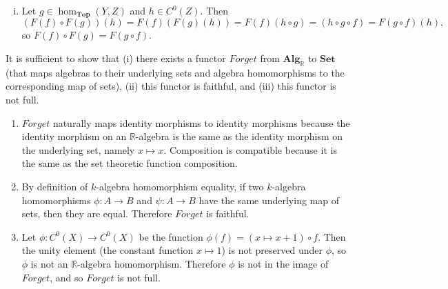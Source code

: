 \documentclass{article}
\newenvironment{problem}[2][Problem]{\begin{trivlist}
\item[\hskip \labelsep {\bfseries #1}\hskip \labelsep {\bfseries #2.}]}{\end{trivlist}}
\newenvironment{problempart}[1]{\begin{trivlist}\item[\textbf{Part #1.}]}{\end{trivlist}}
\begin{document}
\begin{problem}{7}
\begin{problempart}{(c)}
\begin{enumerate}[(i)]
{      }
      \item{
        Let $g \in \operatorname{hom}_{\textbf{Top}}(Y, Z)$ and $h \in C^0(Z)$.
        Then \[
          (F(f) \circ F(g))(h) = F(f)(F(g)(h))
          = F(f)(h\circ g)
          = (h\circ g\circ f)
          = F(g\circ f)(h),
        \] so $F(f) \circ F(g) = F(g\circ f)$.
        }
    \end{enumerate}
  \end{problempart}
  \begin{problempart}{(d)}
    It is sufficient to show that (i) there exists a functor $\textit{Forget}$ from
    $\textbf{Alg}_\mathbb{R}$ to $\textbf{Set}$ (that maps algebras to their
    underlying sets and algebra homomorphisms to the corresponding map of sets),
    (ii) this functor is faithful, and (iii) this functor is not full.
    \begin{enumerate}
      \item{
        $\mathit{Forget}$ naturally maps identity morphisms to identity morphisms
        because the identity morphism on an $\mathbb{R}$-algebra is the same as
        the identity morphism on the underlying set, namely $x \mapsto x$.
        Composition is compatible because it is the same as the set theoretic
        function composition.
      }
      \item{
        By definition of $k$-algebra homomorphism equality, if two $k$-algebra
        homomorphisms $\phi\colon A \rightarrow B$ and $\psi\colon A \rightarrow B$
        have the same underlying map of sets, then they are equal. Therefore
        $\textit{Forget}$ is faithful.
      }
      \item{
        Let $\phi\colon C^0(X) \rightarrow C^0(X)$ be the function
        $\phi(f) = (x\mapsto x + 1) \circ f$. Then the unity element (the constant
        function $x \mapsto 1$)
        is not preserved under $\phi$, so $\phi$ is not an $\mathbb{R}$-algebra
        homomorphism. Therefore $\phi$ is not in the image of $\textit{Forget}$, and so $\textit{Forget}$ is
        not full.
      }
    \end{enumerate}
  \end{problempart}
\end{problem}
\end{document}
